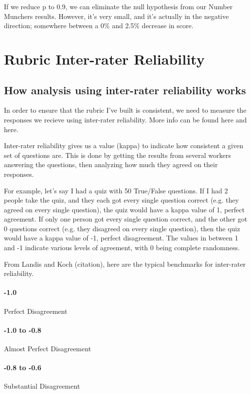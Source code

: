 				If we reduce p to 0.9, we can eliminate the null hypothesis from our Number Munchers results. However, it's very small, and it's actually in the negative direction; somewhere between a 0\% and 2.5\% decrease in score.

		\section{Rubric Inter-rater Reliability}
			\subsection{How analysis using inter-rater reliability works}

				In order to ensure that the rubric I've built is consistent, we need to measure the responses we recieve using inter-rater reliability. More info can be found here and here.

				Inter-rater reliability gives us a value (kappa) to indicate how consistent a given set of questions are. This is done by getting the results from several workers answering the questions, then analyzing how much they agreed on their responses.

				For example, let's say I had a quiz with 50 True/False questions. If I had 2 people take the quiz, and they each got every single question correct (e.g. they agreed on every single question), the quiz would have a kappa value of 1, perfect agreement. If only one person got every single question correct, and the other got 0 questions correct (e.g. they disagreed on every single question), then the quiz would have a kappa value of -1, perfect disagreement. The values in between 1 and -1 indicate various levels of agreement, with 0 being complete randomness.

				From Landis and Koch (citation), here are the typical benchmarks for inter-rater reliability.

				\paragraph{-1.0} Perfect Disagreement

				\paragraph{-1.0 to -0.8} Almost Perfect Disagreement

				\paragraph{-0.8 to -0.6} Substantial Disagreement

